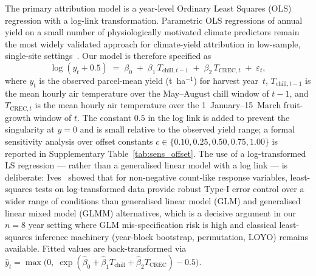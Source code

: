\documentclass[agronomy,article,submit,pdftex,moreauthors]{Definitions/mdpi}
\begin{document}
The primary attribution model is a year-level Ordinary Least Squares (OLS) regression with a log-link transformation. Parametric OLS regressions of annual yield on a small number of physiologically motivated climate predictors remain the most widely validated approach for climate-yield attribution in low-sample, single-site settings~\cite{lobell2007,lobellburke2010}. Our model is therefore specified as
\begin{equation}
\log(y_{t}+0.5) \;=\; \beta_{0} \;+\; \beta_{1}\,T_{\text{chill},t-1} \;+\; \beta_{2}\,T_{\text{CREC},t} \;+\; \varepsilon_{t},
\label{eq:primary}
\end{equation}
where $y_{t}$ is the observed parcel-mean yield (t~ha$^{-1}$) for harvest year~$t$, $T_{\text{chill},t-1}$ is the mean hourly air temperature over the May--August chill window of $t-1$, and $T_{\text{CREC},t}$ is the mean hourly air temperature over the 1~January--15~March fruit-growth window of $t$. The constant $0.5$ in the log link is added to prevent the singularity at $y=0$ and is small relative to the observed yield range; a formal sensitivity analysis over offset constants $c\in\{0.10,0.25,0.50,0.75,1.00\}$ is reported in Supplementary Table~\ref{tab:sens_offset}. The use of a log-transformed LS regression --- rather than a generalised linear model with a log link --- is deliberate: Ives~\cite{ives2015} showed that for non-negative count-like response variables, least-squares tests on log-transformed data provide robust Type-I error control over a wider range of conditions than generalised linear model (GLM) and generalised linear mixed model (GLMM) alternatives, which is a decisive argument in our $n=8$ year setting where GLM mis-specification risk is high and classical least-squares inference machinery (year-block bootstrap, permutation, LOYO) remains available. Fitted values are back-transformed via $\hat{y}_{t}=\max\bigl(0,\;\exp(\hat{\beta}_{0}+\hat{\beta}_{1}T_{\text{chill}}+\hat{\beta}_{2}T_{\text{CREC}})-0.5\bigr)$.
\end{document}
